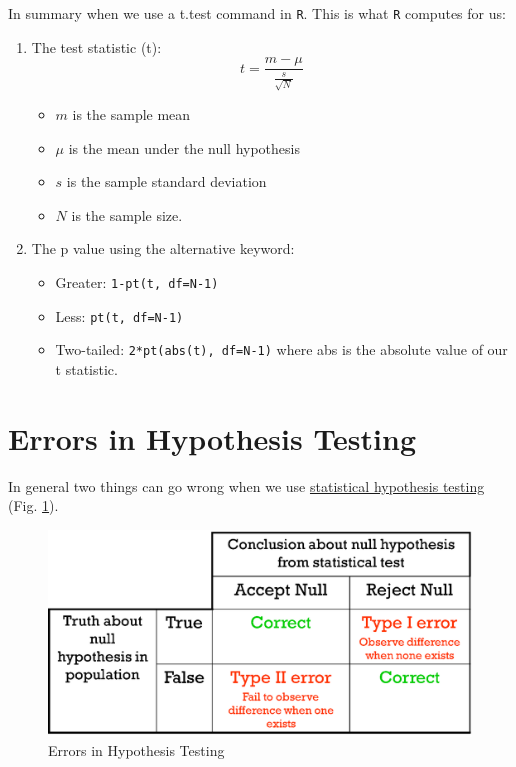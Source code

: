 \documentclass[
]{book}
\providecommand{\tightlist}{%
  \setlength{\itemsep}{0pt}\setlength{\parskip}{0pt}}
\theoremstyle{definition}
\theoremstyle{definition}
\theoremstyle{definition}
\theoremstyle{definition}
\theoremstyle{remark}
\begin{document}
In summary when we use a t.test command in \texttt{R}. This is what \texttt{R} computes for us:

\begin{enumerate}
\def\labelenumi{\arabic{enumi}.}
\item
  The test statistic (t): \[t=\frac{m-\mu}{\frac{s}{\sqrt{N}}}\]

  \begin{itemize}
  \tightlist
  \item
    \(m\) is the sample mean
  \item
    \(\mu\) is the mean under the null hypothesis
  \item
    \(s\) is the sample standard deviation
  \item
    \(N\) is the sample size.
  \end{itemize}
\item
  The p value using the alternative keyword:

  \begin{itemize}
  \tightlist
  \item
    Greater: \texttt{1-pt(t,\ df=N-1)}
  \item
    Less: \texttt{pt(t,\ df=N-1)}
  \item
    Two-tailed: \texttt{2*pt(abs(t),\ df=N-1)} where abs is the absolute value of our t statistic.
  \end{itemize}
\end{enumerate}

\hypertarget{errors-in-hypothesis-testing}{%
\section{Errors in Hypothesis Testing}\label{errors-in-hypothesis-testing}}

In general two things can go wrong when we use \href{https://latrobe.libguides.com/maths/hypothesis-testing}{statistical hypothesis testing} (Fig. \ref{fig:errorsHypTesting}).

\begin{figure}
\includegraphics[width=0.75\linewidth,height=0.75\textheight]{hypothesis_testing_errors} \caption{Errors in Hypothesis Testing}\label{fig:errorsHypTesting}
\end{figure}
\end{document}

